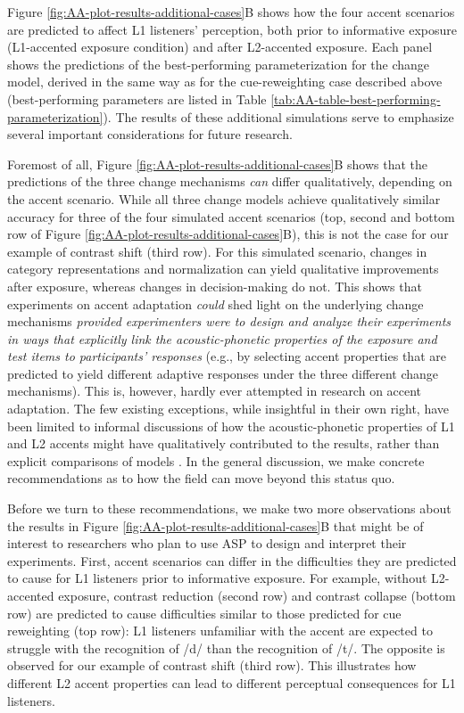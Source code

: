 \documentclass[
  11pt,
  man,floatsintext]{apa6}
\begin{document}
Figure \ref{fig:AA-plot-results-additional-cases}B shows how the four accent scenarios are predicted to affect L1 listeners' perception, both prior to informative exposure (L1-accented exposure condition) and after L2-accented exposure. Each panel shows the predictions of the best-performing parameterization for the change model, derived in the same way as for the cue-reweighting case described above (best-performing parameters are listed in Table \ref{tab:AA-table-best-performing-parameterization}). The results of these additional simulations serve to emphasize several important considerations for future research.

Foremost of all, Figure \ref{fig:AA-plot-results-additional-cases}B shows that the predictions of the three change mechanisms \emph{can} differ qualitatively, depending on the accent scenario. While all three change models achieve qualitatively similar accuracy for three of the four simulated accent scenarios (top, second and bottom row of Figure \ref{fig:AA-plot-results-additional-cases}B), this is not the case for our example of contrast shift (third row). For this simulated scenario, changes in category representations and normalization can yield qualitative improvements after exposure, whereas changes in decision-making do not. This shows that experiments on accent adaptation \emph{could} shed light on the underlying change mechanisms \emph{provided experimenters were to design and analyze their experiments in ways that explicitly link the acoustic-phonetic properties of the exposure and test items to participants' responses} (e.g., by selecting accent properties that are predicted to yield different adaptive responses under the three different change mechanisms). This is, however, hardly ever attempted in research on accent adaptation. The few existing exceptions, while insightful in their own right, have been limited to informal discussions of how the acoustic-phonetic properties of L1 and L2 accents might have qualitatively contributed to the results, rather than explicit comparisons of models \autocites[e.g.,][]{schertz2015,tan2021,xie2016jep}. In the general discussion, we make concrete recommendations as to how the field can move beyond this status quo.

Before we turn to these recommendations, we make two more observations about the results in Figure \ref{fig:AA-plot-results-additional-cases}B that might be of interest to researchers who plan to use ASP to design and interpret their experiments. First, accent scenarios can differ in the difficulties they are predicted to cause for L1 listeners prior to informative exposure. For example, without L2-accented exposure, contrast reduction (second row) and contrast collapse (bottom row) are predicted to cause difficulties similar to those predicted for cue reweighting (top row): L1 listeners unfamiliar with the accent are expected to struggle with the recognition of /d/ than the recognition of /t/. The opposite is observed for our example of contrast shift (third row). This illustrates how different L2 accent properties can lead to different perceptual consequences for L1 listeners.
\end{document}
